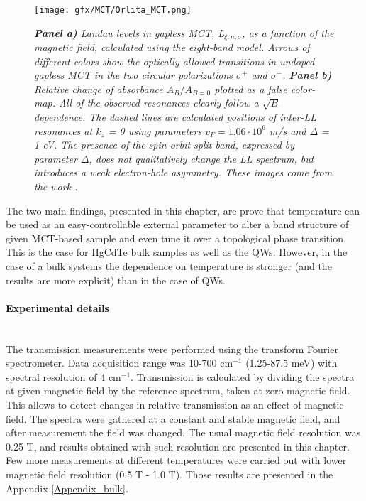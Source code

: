 \documentclass[titlepage,a4paper]{book}
\newcommand{\wciecie}{\quad\phantom{v}}
\newcommand{\myparagraph}[1]{\paragraph{#1}\mbox{}\\}
\begin{document}
\begin{figure}[ht]
	\centering
	\texttt{[image: gfx/MCT/Orlita\_MCT.png]}
	\vspace{-10pt}
	\caption{\textit{\textbf{Panel a)} Landau levels in gapless MCT, L$_{\xi,n,\sigma}$, as a function of the magnetic field, calculated using the eight-band model. Arrows of different colors show the optically allowed transitions in undoped gapless MCT in the two circular polarizations $\sigma^{+}$ and $\sigma^{-}$. \textbf{Panel b)} Relative change of absorbance $A_B/A_{B=0}$ plotted as a false color-map. All of the observed resonances clearly follow a $\sqrt{B}$-dependence. The dashed lines are calculated positions of inter-LL resonances at $k_z$ = 0 using parameters $v_F = 1.06 \cdot 10^6$ m/s and $\Delta$ = 1 eV. The presence of the spin-orbit split band, expressed by parameter $\Delta$, does not qualitatively change the LL spectrum, but introduces a weak electron-hole asymmetry. These images come from the work \cite{Orlita_MCT}.}}
	\label{fig:Orlita_MCT}
\end{figure}


The two main findings, presented in this chapter, are prove that temperature can be used as an easy-controllable external parameter to alter a band structure of given MCT-based sample and even tune it over a topological phase transition. This is the case for HgCdTe bulk samples as well as the QWs. However, in the case of a bulk systems the dependence on temperature is stronger (and the results are more explicit) than in the case of QWs. 


\myparagraph{Experimental details}
\wciecie
The transmission measurements were performed using the transform Fourier spectrometer. Data acquisition range was 10-700 cm$^{-1}$ (1.25-87.5 meV) with spectral resolution of 4 cm$^{-1}$. Transmission is calculated by dividing the spectra at given magnetic field by the reference spectrum, taken at zero magnetic field. This allows to detect changes in relative transmission as an effect of magnetic field. The spectra were gathered at a constant and stable magnetic field, and after measurement the field was changed. The usual magnetic field resolution was 0.25 T, and results obtained with such resolution are presented in this chapter. Few more measurements at different temperatures were carried out with lower magnetic field resolution (0.5 T - 1.0 T). Those results are presented in the Appendix \ref{Appendix_bulk}.
\end{document}
